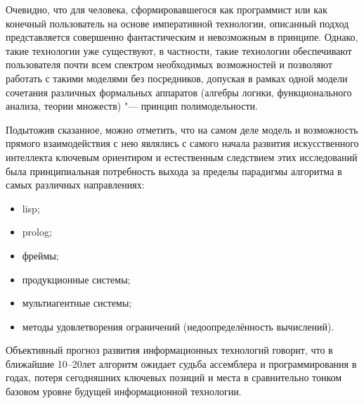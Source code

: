 \begin{rem}
  Очевидно, что для человека, сформировавшегося как программист или
  как конечный пользователь на основе императивной технологии,
  описанный подход представляется совершенно фантастическим и
  невозможным в принципе. Однако, такие технологии уже существуют, в
  частности, такие технологии обеспечивают пользователя почти всем
  спектром необходимых возможностей и позволяют работать с такими
  моделями без посредников, допуская в рамках одной модели сочетания
  различных формальных аппаратов (алгебры логики, функционального
  анализа, теории множеств) "--- принцип полимодельности.
\end{rem}

Подытожив сказанное, можно отметить, что на самом деле модель и
возможность прямого взаимодействия с нею являлись с самого начала
развития искусственного интеллекта ключевым ориентиром и естественным
следствием этих исследований была принципиальная потребность выхода за
пределы парадигмы алгоритма в самых различных направлениях:
\begin{itemize}
\item lisp;
\item prolog;
\item фреймы;
\item продукционные системы;
\item мультиагентные системы;
\item методы удовлетворения ограничений (недоопределённость
  вычислений).
\end{itemize}

Объективный прогноз развития информационных технологий говорит, что в
ближайшие 10--20лет алгоритм ожидает судьба ассемблера и
программирования в годах, потеря сегодняшних ключевых позиций и места
в сравнительно тонком базовом уровне будущей информационной технологии.

